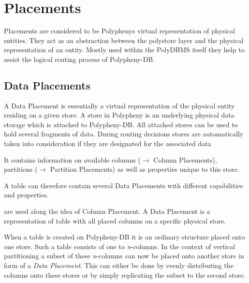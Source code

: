 

\section{Placements}
Placements are considered to be Polyphenys virtual representation of physical entities.
They act as an abstraction between the polystore layer and the physical representation of an entity. 
Mostly used within the PolyDBMS itself they help to assist the logical routing process of Polypheny-DB.



\subsection{Data Placements}

A Data Placement is essentially a virtual representation of the physical entity residing on a given store.
A store in Polypheny is an underlying physical data storage which is 
attached to Polypheny-DB.
All attached stores can be used to hold several fragments of data. 
During routing decisions stores are automatically taken into consideration if they are designated for the associated data 

It contains information on available columns ($\rightarrow$ Column Placements), partitions ($\rightarrow$ Partition Placements)
as well as properties unique to this store.

A table can therefore contain several Data Placements with different capabilities and properties. 

are used along the idea of Column Placement. A Data Placement 
    is a representation of table with all placed columns on a specific physical store.

    When a table is created on Polypheny-DB it is an ordinary structure placed onto 
    one store. Such a table consists of one to \textit{n}-columns.
    In the context of vertical partitioning a subset of these \textit{n}-columns can now 
    be placed onto another store in form of a \textit{Data Placement}.
    This can either be done by evenly distributing the columns onto these stores 
    or by simply replicating the subset to the second store.\\

    


